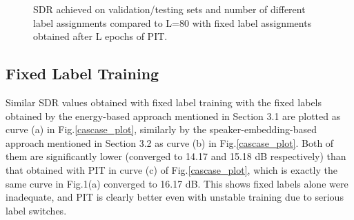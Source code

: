\documentclass{article}
\begin{document}
\begin{figure}[h]

    \caption{\small SDR achieved on validation/testing sets and number of different label assignments compared to L=80 with fixed label assignments obtained after L epochs of PIT.}
    \vspace{-7pt}
    \label{1to100plot}
\end{figure}


\vspace{-7pt}
\subsection{Fixed Label Training}
\vspace{-7pt}
Similar SDR values obtained with fixed label training with the fixed labels obtained by the energy-based approach mentioned in Section 3.1 are plotted as curve (a) in Fig.\ref{cascase_plot}, similarly by the speaker-embedding-based approach mentioned in Section 3.2 as curve (b) in Fig.\ref{cascase_plot}. Both of them are significantly lower (converged to 14.17 and 15.18 dB respectively) than that obtained with PIT in curve (c) of Fig.\ref{cascase_plot}, which is exactly the same curve in Fig.1(a) converged to 16.17 dB. This shows fixed labels alone were inadequate, and PIT is clearly better even with unstable training due to serious label switches.
\end{document}
